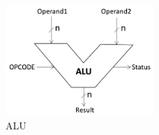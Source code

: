 \begin{figure}
	\centering
	\includegraphics[width=0.5\textwidth]
	{pics/alu.png}
	\caption{ALU}
	\label{alu}
\end{figure}

